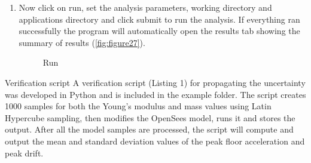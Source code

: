 \begin{enumerate}
\item Now click on run, set the analysis parameters, working directory and applications directory and click submit to run the analysis. 
If everything ran successfully the program will automatically open the results tab showing the summary of results (\autoref{fig:figure27}).
\begin{figure}[!htbp]
  \caption{Run}
  \label{fig:figure27}
\end{figure}

\end{enumerate}



Verification script
A verification script (Listing 1) for propagating the uncertainty was developed in Python and is included in the example folder. 
The script creates 1000 samples for both the Young’s modulus and mass values using Latin Hypercube sampling, 
then modifies the OpenSees model, runs it and stores the output. 
After all the model samples are processed, the script will compute and output the mean and standard deviation values of the peak floor acceleration and peak drift.

